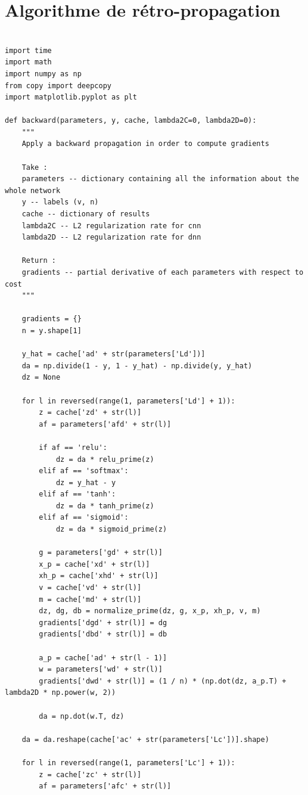 \documentclass[12pt,a4paper]{extarticle}
\begin{document}
\section{Algorithme de rétro-propagation}
\lstset{language=Python}
\begin{lstlisting}[mathescape]

import time
import math
import numpy as np
from copy import deepcopy
import matplotlib.pyplot as plt

def backward(parameters, y, cache, lambda2C=0, lambda2D=0):
    """
    Apply a backward propagation in order to compute gradients

    Take :
    parameters -- dictionary containing all the information about the whole network
    y -- labels (v, n)
    cache -- dictionary of results
    lambda2C -- L2 regularization rate for cnn
    lambda2D -- L2 regularization rate for dnn

    Return :
    gradients -- partial derivative of each parameters with respect to cost
    """

    gradients = {}
    n = y.shape[1]

    y_hat = cache['ad' + str(parameters['Ld'])]
    da = np.divide(1 - y, 1 - y_hat) - np.divide(y, y_hat)
    dz = None

    for l in reversed(range(1, parameters['Ld'] + 1)):
        z = cache['zd' + str(l)]
        af = parameters['afd' + str(l)]

        if af == 'relu':
            dz = da * relu_prime(z)
        elif af == 'softmax':
            dz = y_hat - y
        elif af == 'tanh':
            dz = da * tanh_prime(z)
        elif af == 'sigmoid':
            dz = da * sigmoid_prime(z)

        g = parameters['gd' + str(l)]
        x_p = cache['xd' + str(l)]
        xh_p = cache['xhd' + str(l)]
        v = cache['vd' + str(l)]
        m = cache['md' + str(l)]
        dz, dg, db = normalize_prime(dz, g, x_p, xh_p, v, m)
        gradients['dgd' + str(l)] = dg
        gradients['dbd' + str(l)] = db

        a_p = cache['ad' + str(l - 1)]
        w = parameters['wd' + str(l)]
        gradients['dwd' + str(l)] = (1 / n) * (np.dot(dz, a_p.T) + lambda2D * np.power(w, 2))

        da = np.dot(w.T, dz)

    da = da.reshape(cache['ac' + str(parameters['Lc'])].shape)

    for l in reversed(range(1, parameters['Lc'] + 1)):
        z = cache['zc' + str(l)]
        af = parameters['afc' + str(l)]


\end{lstlisting}
\end{document}

